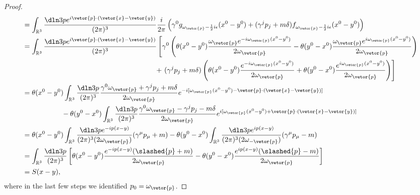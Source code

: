 \begin{proof}
\begin{align*}
                                  &= \int_{\mathbb{R}^3} \frac{\dln3p e^{i\vetor{p}\cdot(\vetor{x} - \vetor{y})}}{(2\pi)^3} \frac{i}{2\pi}\left(\gamma^0  g_{\omega_{\vetor{p}} - \frac12 i \epsilon}(x^0 - y^0) + (\gamma^j p_j + m \delta) f_{\omega_{\vetor{p}} - \frac12 i \epsilon}(x^0 - y^0) \right)\\
                                  &= \int_{\mathbb{R}^3} \frac{\dln3p e^{i\vetor{p}\cdot(\vetor{x} - \vetor{y})}}{(2\pi)^3} \left[\gamma^0 \left(\theta(x^0 - y^0) \frac{\omega_{\vetor{p}}e^{-i \omega_{\vetor{p}} (x^0 - y^0)}}{2\omega_{\vetor{p}}} - \theta(y^0 - x^0) \frac{\omega_{\vetor{p}}e^{i \omega_{\vetor{p}} (x^0 - y^0)}}{2\omega_{\vetor{p}}} \right)\right.\\
                                  &{}\phantom{=\int_{\mathbb{R}^3} \frac{\dln3p e^{i\vetor{p}\cdot(\vetor{x} - \vetor{y})}}{(2\pi)^3}}+ \left.(\gamma^j p_j + m \delta) \left(\theta(x^0 - y^0) \frac{e^{-i \omega_{\vetor{p}}(x^0 - y^0)}}{2 \omega_{\vetor{p}}} + \theta(y^0 - x^0) \frac{e^{i \omega_{\vetor{p}} (x^0 - y^0)}}{2 \omega_{\vetor{p}}}\right)\right]\\
                                  &= \theta(x^0 - y^0)\int_{\mathbb{R}^3} \frac{\dln3p}{(2\pi)^3} \frac{\gamma^0 \omega_{\vetor{p}} + \gamma^jp_j + m \delta}{2\omega_{\vetor{p}}} e^{-i[\omega_{\vetor{p}} (x^0 - y^0) - \vetor{p}\cdot(\vetor{x} - \vetor{y})]}\\
                                  &{}\phantom{=\theta(x^0 - y^0)}- \theta(y^0 - x^0)\int_{\mathbb{R}^3} \frac{\dln3p}{(2\pi)^3} \frac{\gamma^0 \omega_{\vetor{p}} - \gamma^jp_j - m \delta}{2\omega_{\vetor{p}}} e^{i[\omega_{\vetor{p}} (x^0 - y^0) + \vetor{p}\cdot(\vetor{x} - \vetor{y})]}\\
                                  &= \theta(x^0 - y^0) \int_{\mathbb{R}^3} \frac{\dln3p e^{-i p (x - y)}}{(2\pi)^3(2\omega_{\vetor{p}})} (\gamma^{\mu}p_\mu + m) - \theta(y^0 - x^0) \int_{\mathbb{R}^3} \frac{\dln3pe^{i p (x - y)}}{(2\pi)^3(2\omega_{-\vetor{p}})} (\gamma^\mu p_\mu - m)\\
                                  &= \int_{\mathbb{R}^3} \frac{\dln3p}{(2\pi)^3} \left[\theta(x^0 - y^0)  \frac{e^{-i p (x - y)}(\slashed{p} + m)}{2\omega_{\vetor{p}}}  - \theta(y^0 - x^0) \frac{e^{i p (x - y)}(\slashed{p} - m)}{2\omega_{\vetor{p}}} \right]\\
                                  &= S(x - y),
   \end{align*}
   where in the last few steps we identified \(p_0 = \omega_{\vetor{p}}\).


\end{proof}

